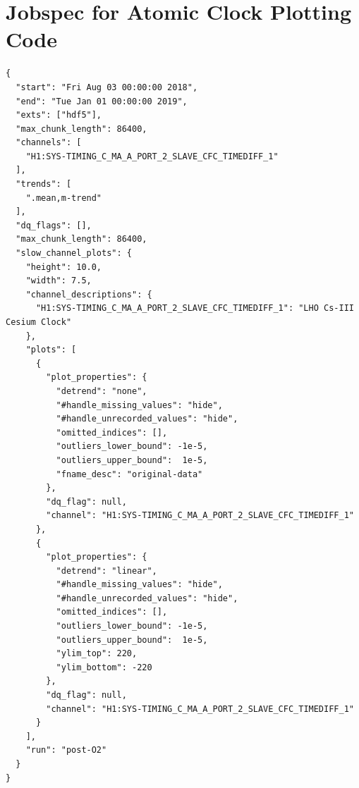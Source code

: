 \documentclass{article}
\begin{document}
\section{Jobspec for Atomic Clock Plotting Code}
\label{sec:jobspec}
	\begin{lstlisting}
{
  "start": "Fri Aug 03 00:00:00 2018",
  "end": "Tue Jan 01 00:00:00 2019",
  "exts": ["hdf5"],
  "max_chunk_length": 86400,
  "channels": [
    "H1:SYS-TIMING_C_MA_A_PORT_2_SLAVE_CFC_TIMEDIFF_1"
  ],
  "trends": [
    ".mean,m-trend"
  ],
  "dq_flags": [],
  "max_chunk_length": 86400,
  "slow_channel_plots": {
    "height": 10.0,
    "width": 7.5,
    "channel_descriptions": {
      "H1:SYS-TIMING_C_MA_A_PORT_2_SLAVE_CFC_TIMEDIFF_1": "LHO Cs-III Cesium Clock"
    },
    "plots": [
      {
        "plot_properties": {
          "detrend": "none",
          "#handle_missing_values": "hide",
          "#handle_unrecorded_values": "hide",
          "omitted_indices": [],
          "outliers_lower_bound": -1e-5,
          "outliers_upper_bound":  1e-5,
          "fname_desc": "original-data"
        },
        "dq_flag": null,
        "channel": "H1:SYS-TIMING_C_MA_A_PORT_2_SLAVE_CFC_TIMEDIFF_1"
      },
      {
        "plot_properties": {
          "detrend": "linear",
          "#handle_missing_values": "hide",
          "#handle_unrecorded_values": "hide",
          "omitted_indices": [],
          "outliers_lower_bound": -1e-5,
          "outliers_upper_bound":  1e-5,
          "ylim_top": 220,
          "ylim_bottom": -220
        },
        "dq_flag": null,
        "channel": "H1:SYS-TIMING_C_MA_A_PORT_2_SLAVE_CFC_TIMEDIFF_1"
      }
    ],
    "run": "post-O2"
  }
}
\end{lstlisting}
\clearpage
\end{document}
